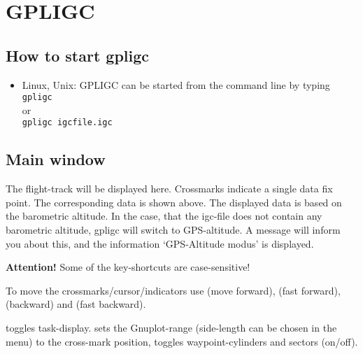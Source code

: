 

\section{GPLIGC}

\subsection{How to start gpligc}

\begin{itemize}
\item{Linux, Unix:}
GPLIGC can be started from the command line by typing \\
\texttt{gpligc}\\
or\\
\texttt{gpligc  igcfile.igc}


\end{itemize}

\subsection{Main window}
The flight-track will be displayed here.
Crossmarks indicate a single data fix point.
The corresponding data is shown above.
The displayed data is based on the barometric altitude.
In the case, that the igc-file does not contain any barometric altitude,
gpligc will switch to GPS-altitude.
A message will inform you about this, and
the information `GPS-Altitude modus' is displayed.

\textbf{Attention!} Some of the key-shortcuts are case-sensitive!

To move the crossmarks/cursor/indicators use  (move forward),  (fast forward),  (backward) and  (fast backward).

 toggles task-display.
 sets the Gnuplot-range (side-length can be chosen in the menu) to the cross-mark position,
 toggles waypoint-cylinders and sectors (on/off).

